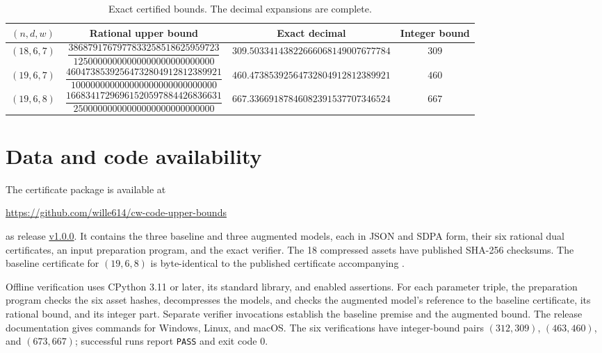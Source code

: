\documentclass[11pt]{article}
\begin{document}
\begin{table}[htbp]
\centering
\caption{Exact certified bounds. The decimal expansions are complete.}
\label{tab:results}
\footnotesize
\setlength{\tabcolsep}{4pt}
\renewcommand{\arraystretch}{1.75}
\begin{tabular}{@{}cccc@{}}
\toprule
$(n,d,w)$ & Rational upper bound & Exact decimal & Integer bound\\
\midrule
$(18,6,7)$ &
$\dfrac{3868791767977833258518625959723}{12500000000000000000000000000}$ &
$309.50334143822666068149007677784$ & $309$\\[4pt]
$(19,6,7)$ &
$\dfrac{46047385392564732804912812389921}{100000000000000000000000000000}$ &
$460.47385392564732804912812389921$ & $460$\\[4pt]
$(19,6,8)$ &
$\dfrac{16683417296961520597884426836631}{25000000000000000000000000000}$ &
$667.33669187846082391537707346524$ & $667$\\
\bottomrule
\end{tabular}
\end{table}

\section{Data and code availability}\label{sec:data}

The certificate package is available at
\begin{center}
\url{https://github.com/wille614/cw-code-upper-bounds}
\end{center}
as release \href{https://github.com/wille614/cw-code-upper-bounds/releases/tag/v1.0.0}{v1.0.0}.
It contains the three baseline and three augmented models, each in JSON
and SDPA form, their six rational dual certificates, an input preparation
program, and the exact verifier. The 18 compressed assets have published
SHA-256 checksums. The baseline certificate for $(19,6,8)$ is byte-identical
to the published certificate accompanying \cite{Chang}.

Offline verification uses CPython 3.11 or later, its standard library, and
enabled assertions. For each parameter triple, the preparation program
checks the six asset hashes, decompresses the models, and checks the
augmented model's reference to the baseline certificate, its rational bound,
and its integer part. Separate verifier invocations establish the baseline
premise and the augmented bound. The release documentation gives commands
for Windows, Linux, and macOS. The six verifications have integer-bound
pairs $(312,309)$, $(463,460)$, and $(673,667)$; successful runs report
\texttt{PASS} and exit code $0$.
\end{document}
